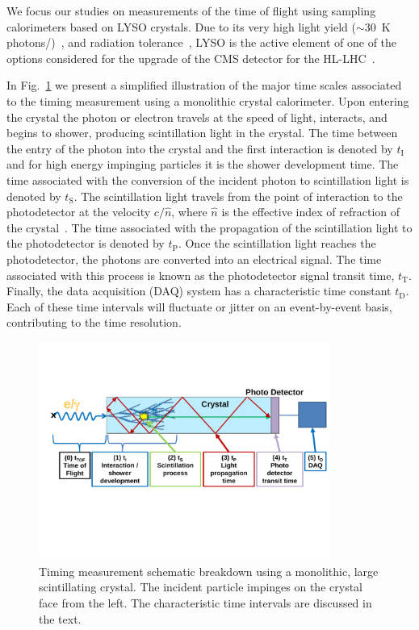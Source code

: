 We focus our studies on measurements of the time of flight using sampling calorimeters 
based on LYSO crystals. Due to its very high light yield 
($\sim 30$~\unit{K} photons/\MeV)~\cite{LYSOProperties}, and radiation 
tolerance~\cite{5402126, 4291695, 5402125, Dissertori:2013rma}, LYSO
is the active element of one of the options considered for the upgrade of the
CMS detector for the HL-LHC~\cite{Contardo:1605208}. 

In Fig.~\ref{fig:ScintillatorTiming} we present a simplified illustration of
the major time scales associated to the timing measurement using a monolithic
crystal calorimeter. Upon entering the crystal the photon or electron travels
at the speed of light, interacts, and begins to shower, producing scintillation light in the crystal. 
The time between the entry of the photon into the crystal and the first interaction is denoted by
$t_\mathrm{I}$ and for high energy impinging particles it is the shower development time. 
The time associated with the conversion of the incident photon to
scintillation light is denoted by $t_\mathrm{S}$. The scintillation light travels from
the point of interaction to the photodetector at the velocity $c/\hat{n}$, where
$\hat{n}$ is the effective index of refraction of the crystal~\cite{Moses}. The
time associated with the propagation of the scintillation light to the photodetector 
is denoted by $t_\mathrm{P}$. Once the scintillation light reaches the photodetector, the  photons 
are converted into an electrical signal. The time associated with this process is known as the
photodetector signal transit time, $t_\mathrm{T}$. Finally, the data acquisition (DAQ)
system has a characteristic time constant $t_\mathrm{D}$. Each of these time intervals will fluctuate or 
jitter on an event-by-event basis, contributing to the time resolution.


\begin{figure}[h] \centering
\includegraphics[width=0.85\textwidth]{figs/timing/ScintillatorTiming_v4}
\caption{ Timing measurement schematic breakdown using a monolithic, large scintillating crystal. 
The incident particle impinges on the crystal face from the left. The characteristic time intervals  are discussed 
in the text.}
\label{fig:ScintillatorTiming}
\end{figure}


